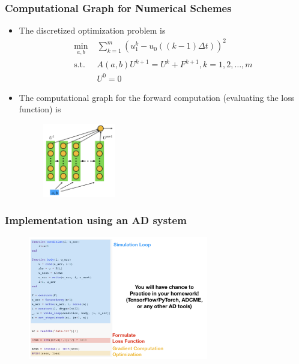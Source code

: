 \documentclass{beamer}
\begin{document}
\begin{frame}
	\frametitle{Computational Graph for Numerical Schemes}

	\begin{itemize}
		\item The discretized optimization problem is
		      \begin{align*}
			      \min_{a, b} & \; \sum_{k=1}^m (u^k_1 - u_0( (k-1)\Delta t))^2      \\
			      \text{s.t.} & \; A(a,b)U^{k+1} = U^k + F^{k+1}, k = 1, 2,\ldots, m \\
			                  & \; U^0 = 0
		      \end{align*}
		\item The computational graph for the forward computation (evaluating the loss function) is
		      \begin{figure}[hbt]
			      \centering
			      \includegraphics[width=0.3\textwidth]{figures/heatcg}
		      \end{figure}

	\end{itemize}
\end{frame}

\begin{frame}
	\frametitle{Implementation using an AD system}

	\begin{figure}[hbt]
		\includegraphics[width=0.7\textwidth]{figures/simulation}
	\end{figure}

\end{frame}
\end{document}
